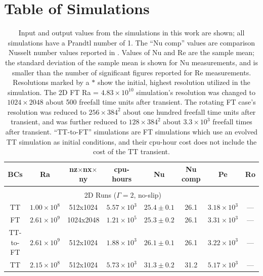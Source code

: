 \documentclass[aps, pre, onecolumn, nofootinbib, notitlepage, groupedaddress, amsfonts, amssymb, amsmath, longbibliography, superscriptaddress]{revtex4-1}
\begin{document}


\appendix
\section{Table of Simulations}
\label{app:table}


\begin{table}[ht]
\caption{
	Input and output values from the simulations in this work are shown; all simulations have a Prandtl number of 1.
	The ``Nu comp'' values are comparison Nusselt number values reported in \cite{zhu&all2018}.
	Values of Nu and Re are the sample mean; the standard deviation of the sample mean is shown for Nu measurements, and is smaller than the number of significant figures reported for Re measurements.
	Resolutions marked by a $*$ show the initial, highest resolution utilized in the simulation.
	The 2D FT Ra = $4.83 \times 10^{10}$ simulation's resolution was changed to $1024\times2048$ about 500 freefall time units after transient.
	The rotating FT case's resolution was reduced to $256\times384^2$ about one hundred freefall time units after transient, and was further reduced to $128\times384^2$ about $3.3\times 10^3$ freefall times after transient.
	``TT-to-FT'' simulations are FT simulations which use an evolved TT simulation as initial conditions, and their cpu-hour cost does not include the cost of the TT transient.
}
\setlength{\tabcolsep}{8pt}
\label{table:speed}
\begin{center}
\begin{tabularx}{\textwidth}{c c c c c c c c}
\hline																	
BCs	&	Ra	&	nz$\times$nx$\times$ny	&	cpu-hours &	Nu	&	Nu comp	&	Pe  & Ro \\
\hline \hline \multicolumn{6}{c}{\vspace{-0.2cm}}\\
\multicolumn{7}{c}{\vspace{0.1cm}2D Runs ($\Gamma = 2$, no-slip)} \\
\hline
TT			&	$1.00 \times 10^8$		&	512x1024	&	$5.57 \times 10^3$	&	$25.4 \pm 0.1$	&	26.1	&	$3.18 \times 10^3$ & --- \\
FT			&	$2.61 \times 10^9$		&	1024x2048	&	$1.21 \times 10^5$	&	$25.3 \pm 0.2$	&	26.1	&	$3.31 \times 10^3$ & --- \\
TT-to-FT	&	$2.61 \times 10^9$		&	512x1024	&	$1.88 \times 10^3$	&	$26.1 \pm 0.1$	&	26.1	&	$3.22 \times 10^3$ & --- \\
TT			&	$2.15 \times 10^8$		&	512x1024	&	$5.73 \times 10^3$	&	$31.3 \pm 0.2$	&	31.2	&	$5.17 \times 10^3$ & --- \\

\end{tabularx}
\end{center}
\end{table}
\end{document}

